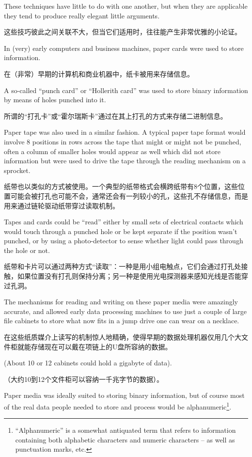 These techniques have little to do with one another,
but when they are applicable they tend to produce really elegant little
arguments.

这些技巧彼此之间关联不大，但当它们适用时，往往能产生非常优雅的小论证。

In (very) early computers and business machines, paper cards were used to
store information.

在（非常）早期的计算机和商业机器中，纸卡被用来存储信息。

A so-called ``punch card'' or 
 ``Hollerith card'' was used to store 
binary information by means of holes punched into it.

所谓的“打孔卡”或“霍尔瑞斯卡”通过在其上打孔的方式来存储二进制信息。

Paper tape 
was also used in a similar fashion.  A typical paper tape format would
involve 8 positions in rows across the tape that might or might not be
punched, often a column of smaller holes would appear as well which 
did not store information but were used to drive the tape through the
reading mechanism on a sprocket.

纸带也以类似的方式被使用。一个典型的纸带格式会横跨纸带有8个位置，这些位置可能会被打孔也可能不会，通常还会有一列较小的孔，这些孔不存储信息，而是用来通过链轮驱动纸带穿过读取机制。

Tapes and cards could be ``read'' either
by small sets of electrical contacts which would touch through a punched
hole or be kept separate if the position wasn't punched, or by using a
photo-detector to sense whether light could pass through the hole or not.

纸带和卡片可以通过两种方式“读取”：一种是用小组电触点，它们会通过打孔处接触，如果位置没有打孔则保持分离；另一种是使用光电探测器来感知光线是否能穿过孔洞。

The mechanisms for reading and writing on these paper media were amazingly
accurate, and allowed early data processing machines to use just a couple
of large file cabinets to store what now fits in a jump drive one can
wear on a necklace.

在这些纸质媒介上读写的机制惊人地精确，使得早期的数据处理机器仅用几个大文件柜就能存储现在可以戴在项链上的U盘所容纳的数据。

(About 10 or 12 cabinets could hold a gigabyte
of data).

（大约10到12个文件柜可以容纳一千兆字节的数据）。

Paper media was ideally suited to storing binary information, but of course
most of the real data people needed to store and process would be 
alphanumeric\footnote{``Alphanumeric'' is a somewhat
antiquated term that refers to information containing both alphabetic 
characters and numeric characters -- as well as punctuation marks, etc.}.

